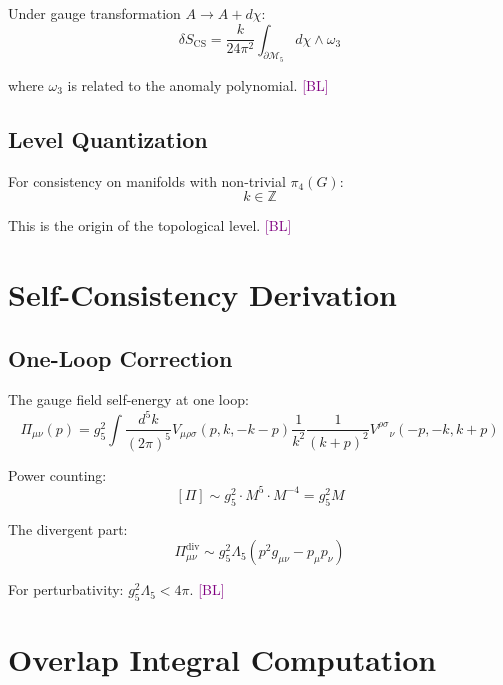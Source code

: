 \documentclass[11pt,a4paper]{article}
\newcommand{\tagBL}{\textcolor{purple}{[BL]}}
\begin{document}
Under gauge transformation $A \to A + d\chi$:
\begin{equation}
\label{eq:app-gauge-var}
\delta S_{\text{CS}} = \frac{k}{24\pi^2} \int_{\partial\mathcal{M}_5} d\chi \wedge \omega_3
\end{equation}

where $\omega_3$ is related to the anomaly polynomial. \tagBL

\subsection{Level Quantization}

For consistency on manifolds with non-trivial $\pi_4(G)$:
\begin{equation}
\label{eq:app-level}
k \in \mathbb{Z}
\end{equation}

This is the origin of the topological level. \tagBL

\section{Self-Consistency Derivation}
\label{app:self}

\subsection{One-Loop Correction}

The gauge field self-energy at one loop:
\begin{equation}
\label{eq:app-self-energy}
\Pi_{\mu\nu}(p) = g_5^2 \int \frac{d^5k}{(2\pi)^5} V_{\mu\rho\sigma}(p,k,-k-p) \frac{1}{k^2} \frac{1}{(k+p)^2} V^{\rho\sigma}{}_\nu(-p,-k,k+p)
\end{equation}

Power counting:
\begin{equation}
\label{eq:app-power}
[\Pi] \sim g_5^2 \cdot M^5 \cdot M^{-4} = g_5^2 M
\end{equation}

The divergent part:
\begin{equation}
\label{eq:app-div}
\Pi_{\mu\nu}^{\text{div}} \sim g_5^2 \Lambda_5 (p^2 g_{\mu\nu} - p_\mu p_\nu)
\end{equation}

For perturbativity: $g_5^2 \Lambda_5 < 4\pi$. \tagBL

\section{Overlap Integral Computation}
\label{app:overlap}
\end{document}
